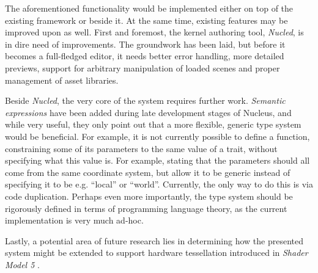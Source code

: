 The aforementioned functionality would be implemented either on top of the existing framework or beside it. At the same time, existing features may be improved upon as well. First and foremost, the kernel authoring tool, \emph{Nucled}, is in dire need of improvements. The groundwork has been laid, but before it becomes a full-fledged editor, it needs better error handling, more detailed previews, support for arbitrary manipulation of loaded scenes and proper management of asset libraries.

Beside \emph{Nucled}, the very core of the system requires further work. \emph{Semantic expressions} have been added during late development stages of Nucleus, and while very useful, they only point out that a more flexible, generic type system would be beneficial. For example, it is not currently possible to define a function, constraining some of its parameters to the same value of a trait, without specifying what this value is. For example, stating that the parameters should all come from the same coordinate system, but allow it to be generic instead of specifying it to be e.g. ``local'' or ``world''. Currently, the only way to do this is via code duplication. Perhaps even more importantly, the type system should be rigorously defined in terms of programming language theory, as the current implementation is very much ad-hoc.

Lastly, a potential area of future research lies in determining how the presented system might be extended to support hardware tessellation introduced in \emph{Shader Model 5} \cite{SM5}.
